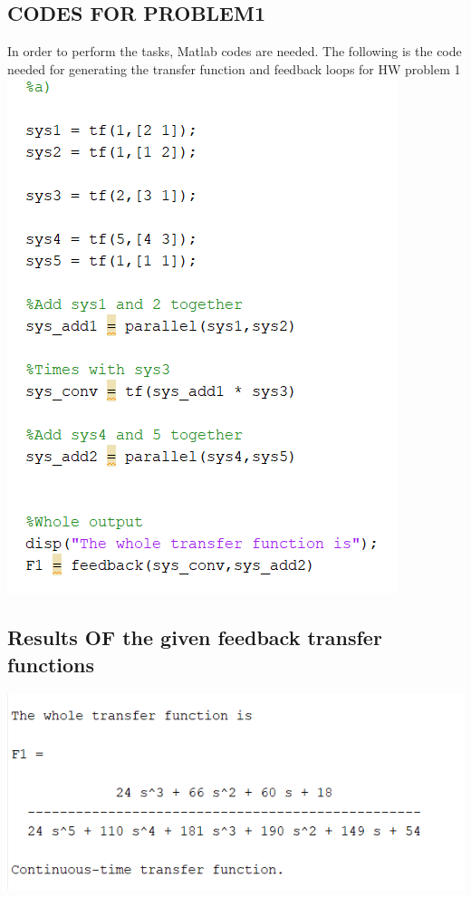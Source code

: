 \documentclass[12pt]{article}
\begin{document}
\subsection{CODES FOR PROBLEM1}
In order to perform the tasks, Matlab codes are needed. The following is the code needed for generating the transfer function and feedback loops for HW problem 1 \\
\includegraphics[scale=1]{../Lab6/HW_2_code1.png} \\

\cleardoublepage

\subsection{Results OF the given feedback transfer functions} 
\includegraphics[scale=1]{../Lab6/HW_2_result1.png} \\
\end{document}
